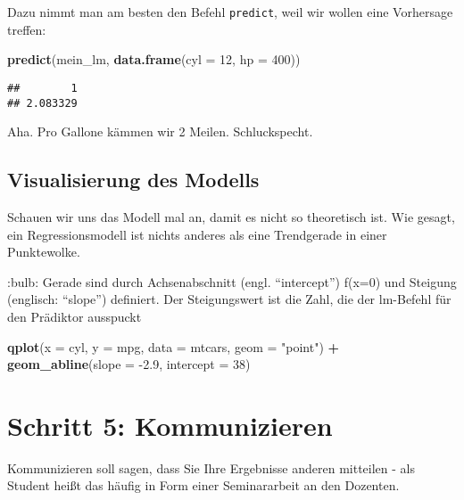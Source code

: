 \documentclass[]{article}
\newenvironment{Shaded}{\begin{snugshade}}{\end{snugshade}}
\newcommand{\DataTypeTok}[1]{\textcolor[rgb]{0.13,0.29,0.53}{#1}}
\newcommand{\DecValTok}[1]{\textcolor[rgb]{0.00,0.00,0.81}{#1}}
\newcommand{\FloatTok}[1]{\textcolor[rgb]{0.00,0.00,0.81}{#1}}
\newcommand{\KeywordTok}[1]{\textcolor[rgb]{0.13,0.29,0.53}{\textbf{#1}}}
\newcommand{\NormalTok}[1]{#1}
\newcommand{\OperatorTok}[1]{\textcolor[rgb]{0.81,0.36,0.00}{\textbf{#1}}}
\newcommand{\StringTok}[1]{\textcolor[rgb]{0.31,0.60,0.02}{#1}}
\begin{document}
Dazu nimmt man am besten den Befehl \texttt{predict}, weil wir wollen
eine Vorhersage treffen:

\begin{Shaded}
\begin{Highlighting}[]
\KeywordTok{predict}\NormalTok{(mein_lm, }\KeywordTok{data.frame}\NormalTok{(}\DataTypeTok{cyl =} \DecValTok{12}\NormalTok{, }\DataTypeTok{hp =} \DecValTok{400}\NormalTok{))}
\end{Highlighting}
\end{Shaded}

\begin{verbatim}
##        1 
## 2.083329
\end{verbatim}

Aha. Pro Gallone kämmen wir 2 Meilen. Schluckspecht.

\hypertarget{visualisierung-des-modells}{%
\subsection{Visualisierung des
Modells}\label{visualisierung-des-modells}}

Schauen wir uns das Modell mal an, damit es nicht so theoretisch ist.
Wie gesagt, ein Regressionsmodell ist nichts anderes als eine
Trendgerade in einer Punktewolke.

:bulb: Gerade sind durch Achsenabschnitt (engl. ``intercept'') f(x=0)
und Steigung (englisch: ``slope'') definiert. Der Steigungswert ist die
Zahl, die der lm-Befehl für den Prädiktor ausspuckt

\begin{Shaded}
\begin{Highlighting}[]
\KeywordTok{qplot}\NormalTok{(}\DataTypeTok{x =}\NormalTok{ cyl,}
      \DataTypeTok{y =}\NormalTok{ mpg,}
      \DataTypeTok{data =}\NormalTok{ mtcars,}
      \DataTypeTok{geom =} \StringTok{"point"}\NormalTok{) }\OperatorTok{+}
\StringTok{  }\KeywordTok{geom_abline}\NormalTok{(}\DataTypeTok{slope =} \FloatTok{-2.9}\NormalTok{, }\DataTypeTok{intercept =} \DecValTok{38}\NormalTok{)}
\end{Highlighting}
\end{Shaded}

\hypertarget{schritt-5-kommunizieren}{%
\section{Schritt 5: Kommunizieren}\label{schritt-5-kommunizieren}}

Kommunizieren soll sagen, dass Sie Ihre Ergebnisse anderen mitteilen -
als Student heißt das häufig in Form einer Seminararbeit an den
Dozenten.
\end{document}
